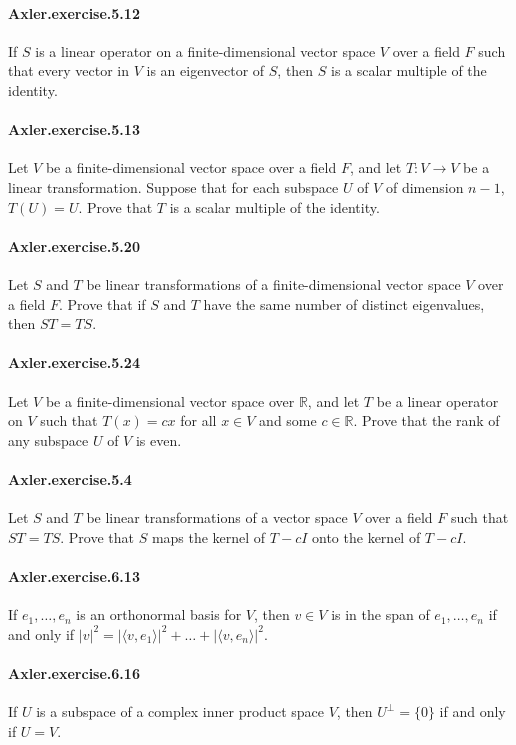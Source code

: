 \documentclass{article}
\begin{document}
\paragraph{Axler.exercise.5.12} If $S$ is a linear operator on a finite-dimensional vector space $V$ over a field $F$ such that every vector in $V$ is an eigenvector of $S$, then $S$ is a scalar multiple of the identity.

\paragraph{Axler.exercise.5.13} Let $V$ be a finite-dimensional vector space over a field $F$, and let $T:V\to V$ be a linear transformation. Suppose that for each subspace $U$ of $V$ of dimension $n-1$, $T(U)=U$. Prove that $T$ is a scalar multiple of the identity.

\paragraph{Axler.exercise.5.20} Let $S$ and $T$ be linear transformations of a finite-dimensional vector space $V$ over a field $F$. Prove that if $S$ and $T$ have the same number of distinct eigenvalues, then $ST=TS$.

\paragraph{Axler.exercise.5.24} Let $V$ be a finite-dimensional vector space over $\mathbb{R}$, and let $T$ be a linear operator on $V$ such that $T(x)=cx$ for all $x\in V$ and some $c\in\mathbb{R}$. Prove that the rank of any subspace $U$ of $V$ is even.

\paragraph{Axler.exercise.5.4} Let $S$ and $T$ be linear transformations of a vector space $V$ over a field $F$ such that $ST=TS$. Prove that $S$ maps the kernel of $T-cI$ onto the kernel of $T-cI$.

\paragraph{Axler.exercise.6.13} If $e_1, \dots, e_n$ is an orthonormal basis for $V$, then $v\in V$ is in the span of $e_1, \dots, e_n$ if and only if $|v|^2 = |\langle v, e_1\rangle|^2 + \dots + |\langle v, e_n\rangle|^2$.

\paragraph{Axler.exercise.6.16} If $U$ is a subspace of a complex inner product space $V$, then $U^{\perp} = \{0\}$ if and only if $U = V$.
\end{document}
